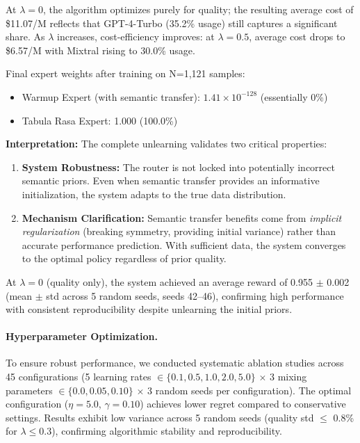 At $\lambda=0$, the algorithm optimizes purely for quality; the resulting average cost of \$11.07/M reflects that GPT-4-Turbo (35.2\% usage) still captures a significant share.
As $\lambda$ increases, cost-efficiency improves: at $\lambda=0.5$, average cost drops to \$6.57/M with Mixtral rising to 30.0\% usage.

Final expert weights after training on N=1,121 samples:
\begin{itemize}[nosep]
    \item Warmup Expert (with semantic transfer): $1.41 \times 10^{-128}$ (essentially 0\%)
    \item Tabula Rasa Expert: 1.000 (100.0\%)
\end{itemize}

\textbf{Interpretation:} The complete unlearning validates two critical properties:
\begin{enumerate}[nosep]
    \item \textbf{System Robustness:} The router is not locked into potentially incorrect semantic priors. Even when semantic transfer provides an informative initialization, the system adapts to the true data distribution.
    \item \textbf{Mechanism Clarification:} Semantic transfer benefits come from \emph{implicit regularization} (breaking symmetry, providing initial variance) rather than accurate performance prediction. With sufficient data, the system converges to the optimal policy regardless of prior quality.
\end{enumerate}

At $\lambda=0$ (quality only), the system achieved an average reward of 0.955 $\pm$ 0.002 (mean $\pm$ std across 5 random seeds, seeds 42--46), confirming high performance with consistent reproducibility despite unlearning the initial priors.

\paragraph{Hyperparameter Optimization.}
To ensure robust performance, we conducted systematic ablation studies across 45 configurations (5 learning rates $\in \{0.1, 0.5, 1.0, 2.0, 5.0\}$ $\times$ 3 mixing parameters $\in \{0.0, 0.05, 0.10\}$ $\times$ 3 random seeds per configuration).
The optimal configuration ($\eta=5.0$, $\gamma=0.10$) achieves lower regret compared to conservative settings.
Results exhibit low variance across 5 random seeds (quality std $\leq$ 0.8\% for $\lambda \leq 0.3$), confirming algorithmic stability and reproducibility.

